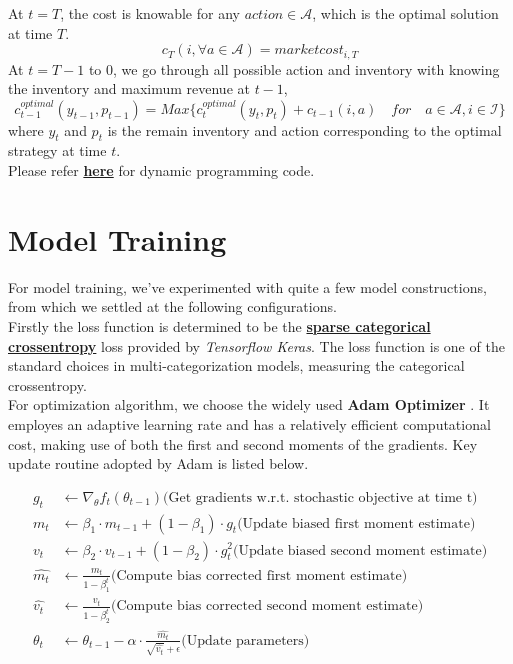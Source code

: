 \documentclass[12pt]{extarticle}
\begin{document}
\noindent At $t = T$, the cost is knowable for any $action\in \mathscr{A}$, which is the optimal solution at time $T$.
$$c_T(i,\forall a \in \mathscr{A}) = market cost_{i,T}$$
At $t = T-1$ to $0$, we go through all possible action and inventory with knowing the inventory and maximum revenue at $t-1$,
$$c_{t-1}^{optimal}(y_{t-1},p_{t-1}) = Max\{c_{t}^{optimal}(y_t,p_t) + c_{t-1}(i,a) \quad for \quad a\in \mathscr{A}, i \in \mathscr{I}\}$$
where $y_t$ and $p_t$ is the remain inventory and action corresponding to the optimal strategy at time $t$.
\\Please refer \href{https://github.com/wangkunzhen/Machine-Learning-5225/blob/master/OptimizationEngine.py}{\textbf{here}} for dynamic programming code.




\section{Model Training}
For model training, we've experimented with quite a few model constructions, from which
we settled at the following configurations.\\


\noindent Firstly the loss function is determined to be the
\href{https://github.com/tensorflow/tensorflow/blob/r1.13/tensorflow/python/keras/backend.py}{\textbf{sparse categorical crossentropy}}
loss provided by \textit{Tensorflow Keras}. The loss function is one of the standard
choices in multi-categorization models, measuring the categorical crossentropy. \\


\noindent For optimization algorithm, we choose the widely used \textbf{Adam Optimizer} \cite{adam}.
It employes an adaptive learning rate and has a relatively efficient computational cost,
making use of both the first and second moments of the gradients. Key update routine
adopted by Adam is listed below.

\begin{equation*}
  \begin{split}
    g_t &\leftarrow \nabla_{\theta} f_t (\theta_{t-1}) \text{(Get gradients w.r.t. stochastic objective at time t)} \\
    m_t &\leftarrow \beta_1 \cdot m_{t-1} + (1-\beta_1) \cdot g_t \text{(Update biased first moment estimate)} \\
    v_t &\leftarrow \beta_2 \cdot v_{t-1} + (1-\beta_2) \cdot g_t^2 \text{(Update biased second moment estimate)} \\
    \hat{m_{t}} &\leftarrow \frac{m_t}{1 - \beta_1^t} \text{(Compute bias corrected first moment estimate)} \\
    \hat{v_{t}} &\leftarrow \frac{v_t}{1 - \beta_2^t} \text{(Compute bias corrected second moment estimate)} \\
    \theta_t &\leftarrow \theta_{t-1} - \alpha \cdot \frac{\hat{m_t}}{\sqrt{\hat{v_t}} + \epsilon} \text{(Update parameters)}
  \end{split}
\end{equation*}
\end{document}
